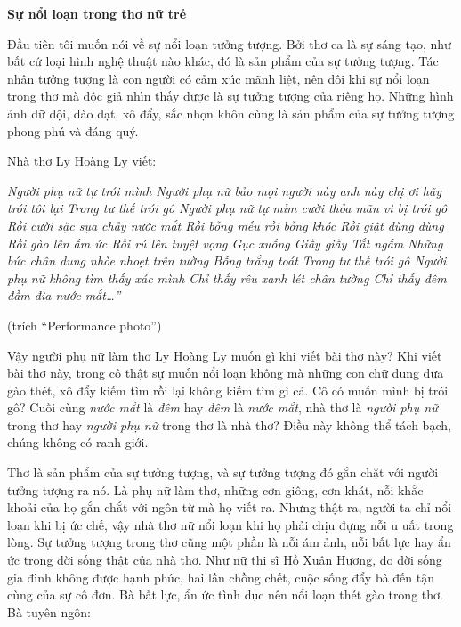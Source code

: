 \documentclass[../main.tex]{subfiles}
\begin{document}
\begin{multicols}{2}
 
\textbf{Sự nổi loạn trong thơ nữ trẻ} 
 
Đầu tiên tôi muốn nói về sự nổi loạn tưởng tượng. Bởi thơ ca là sự sáng tạo, như bất cứ loại hình nghệ thuật nào khác, đó là sản phẩm của sự tưởng tượng. Tác nhân tưởng tượng là con người có cảm xúc mãnh liệt, nên đôi khi sự nổi loạn trong thơ mà độc giả nhìn thấy được là sự tưởng tượng của riêng họ. Những hình ảnh dữ dội, dào dạt, xô đẩy, sắc nhọn khôn cùng là sản phẩm của sự tưởng tượng phong phú và đáng quý.  
 
Nhà thơ Ly Hoàng Ly viết:  
\begin{blockquote}
 
\textit{Người phụ nữ tự trói mình 
Người phụ nữ bảo mọi người này anh này chị ơi hãy trói tôi lại } 
\textit{Trong tư thế trói gô 
Người phụ nữ tự mỉm cười thỏa mãn vì bị trói gô 
Rồi cười sặc sụa chảy nước mắt 
Rồi bỗng mếu rồi bỗng khóc 
Rồi giật đùng đùng 
Rồi gào lên ấm ức 
Rồi rú lên tuyệt vọng 
Gục xuống  
Giẫy giẫy 
Tắt ngấm } 
\textit{Những bức chân dung nhòe nhoẹt trên tường 
Bỗng trắng toát } 
\textit{Trong tư thế trói gô 
Người phụ nữ không tìm thấy xác mình 
Chỉ thấy rêu xanh lét chân tường 
Chỉ thấy đêm đầm đìa nước mắt…”} 
 		        
(trích “Performance photo”) 

\end{blockquote}
 
Vậy người phụ nữ làm thơ Ly Hoàng Ly muốn gì khi viết bài thơ này? Khi viết bài thơ này, trong cô thật sự muốn nổi loạn không mà những con chữ đung đưa gào thét, xô đẩy kiếm tìm rồi lại không kiếm tìm gì cả. Cô có muốn mình bị trói gô? Cuối cùng \textit{nước mắt} là \textit{đêm} hay \textit{đêm} là \textit{nước mắt}, nhà thơ là \textit{người phụ nữ} trong thơ hay \textit{người phụ nữ} trong thơ là nhà thơ? Điều này không thể tách bạch, chúng không có ranh giới. 
 
Thơ là sản phẩm của sự tưởng tượng, và sự tưởng tượng đó gắn chặt với người tưởng tượng ra nó. Là phụ nữ làm thơ, những cơn giông, cơn khát, nỗi khắc khoải của họ gắn chắt với ngôn từ mà họ viết ra. Nhưng thật ra, người ta chỉ nổi loạn khi bị ức chế, vậy nhà thơ nữ nổi loạn khi họ phải chịu đựng nỗi u uất trong lòng. Sự tưởng tượng trong thơ cũng một phần là nỗi ám ảnh, nỗi bất lực hay ẩn ức trong đời sống thật của nhà thơ. Như nữ thi sĩ Hồ Xuân Hương, do đời sống gia đình không được hạnh phúc, hai lần chồng chết, cuộc sống đẩy bà đến tận cùng của sự cô đơn. Bà bất lực, ẩn ức tình dục nên nổi loạn thét gào trong thơ. Bà tuyên ngôn: 
\begin{blockquote}
 

\end{blockquote}
\end{multicols}
\end{document}
